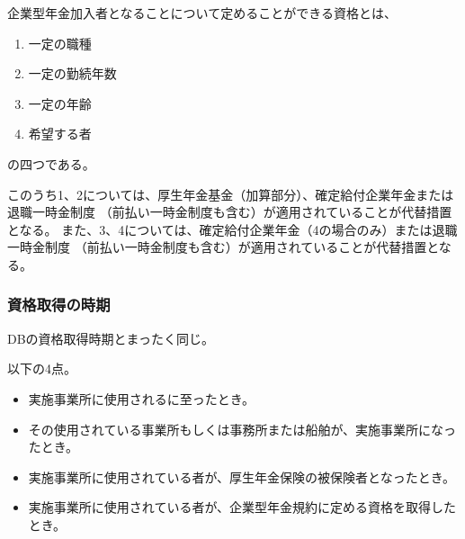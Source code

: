 \begin{sol}
  \;

  企業型年金加入者となることについて定めることができる資格とは、
  \begin{enumerate}
    \item 一定の職種
    \item 一定の勤続年数
    \item 一定の年齢
    \item 希望する者
  \end{enumerate}
  の四つである。

  このうち1、2については、厚生年金基金（加算部分）、確定給付企業年金または退職一時金制度
  （前払い一時金制度も含む）が適用されていることが代替措置となる。
  また、3、4については、確定給付企業年金（4の場合のみ）または退職一時金制度
  （前払い一時金制度も含む）が適用されていることが代替措置となる。


\end{sol}

\newpage


\subsubsection{資格取得の時期}

\begin{itembox}[l]{}
  DBの資格取得時期とまったく同じ。
\end{itembox}

\begin{sol}
  \;

  以下の4点。
  \begin{itemize}
    \item 実施事業所に使用されるに至ったとき。
    \item その使用されている事業所もしくは事務所または船舶が、実施事業所になったとき。
    \item 実施事業所に使用されている者が、厚生年金保険の被保険者となったとき。
    \item 実施事業所に使用されている者が、企業型年金規約に定める資格を取得したとき。
  \end{itemize}
\end{sol}

\newpage
